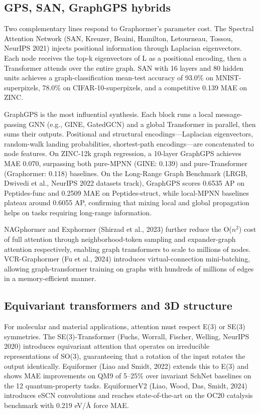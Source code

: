 \documentclass{article}
\begin{document}
\subsection{GPS, SAN, GraphGPS hybrids}\label{gps-san-graphgps-hybrids}

Two complementary lines respond to Graphormer's parameter cost. The Spectral Attention Network (SAN, Kreuzer, Beaini, Hamilton, Letourneau, Tossou, NeurIPS 2021) injects positional information through Laplacian eigenvectors. Each node receives the top-k eigenvectors of L as a positional encoding, then a Transformer attends over the entire graph. SAN with 16 layers and 80 hidden units achieves a graph-classification mean-test accuracy of 93.0\% on MNIST-superpixels, 78.0\% on CIFAR-10-superpixels, and a competitive 0.139 MAE on ZINC.

GraphGPS \citep{rampek2022recipeforageneralp} is the most influential synthesis. Each block runs a local message-passing GNN (e.g., GINE, GatedGCN) and a global Transformer in parallel, then sums their outputs. Positional and structural encodings---Laplacian eigenvectors, random-walk landing probabilities, shortest-path encodings---are concatenated to node features. On ZINC-12k graph regression, a 10-layer GraphGPS achieves MAE 0.070, surpassing both pure-MPNN (GINE: 0.139) and pure-Transformer (Graphormer: 0.118) baselines. On the Long-Range Graph Benchmark (LRGB, Dwivedi et al., NeurIPS 2022 datasets track), GraphGPS scores 0.6535 AP on Peptides-func and 0.2509 MAE on Peptides-struct, while local-MPNN baselines plateau around 0.6055 AP, confirming that mixing local and global propagation helps on tasks requiring long-range information.

NAGphormer \citep{chen2024asurveyongraphneur} and Exphormer (Shirzad et al., 2023) further reduce the O(\(n^2\)) cost of full attention through neighborhood-token sampling and expander-graph attention respectively, enabling graph transformers to scale to millions of nodes. VCR-Graphormer (Fu et al., 2024) introduces virtual-connection mini-batching, allowing graph-transformer training on graphs with hundreds of millions of edges in a memory-efficient manner.

\subsection{Equivariant transformers and 3D structure}\label{equivariant-transformers-and-3d-structure}

For molecular and material applications, attention must respect E(3) or SE(3) symmetries. The SE(3)-Transformer (Fuchs, Worrall, Fischer, Welling, NeurIPS 2020) introduces equivariant attention that operates on irreducible representations of SO(3), guaranteeing that a rotation of the input rotates the output identically. Equiformer (Liao and Smidt, 2022) extends this to E(3) and shows MAE improvements on QM9 of 5--25\% over invariant SchNet baselines on the 12 quantum-property tasks. EquiformerV2 (Liao, Wood, Das, Smidt, 2024) introduces eSCN convolutions and reaches state-of-the-art on the OC20 catalysis benchmark with 0.219 eV/Å force MAE.
\end{document}
